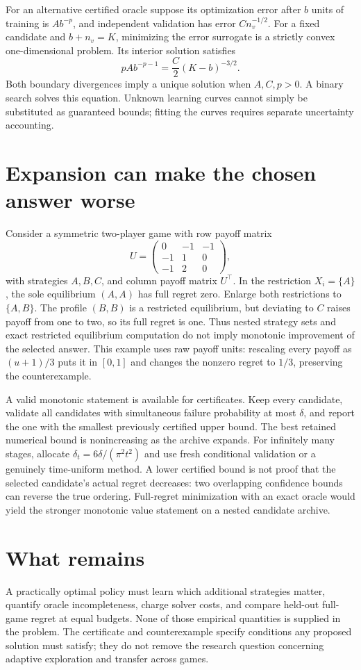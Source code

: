\documentclass[11pt]{article}
\begin{document}
For an alternative certified oracle suppose its optimization error after $b$ units of training is $A b^{-p}$, and independent validation has error $C n_v^{-1/2}$. For a fixed candidate and $b+n_v=K$, minimizing the error surrogate is a strictly convex one-dimensional problem. Its interior solution satisfies
\[
 pA b^{-p-1}=\frac C2(K-b)^{-3/2}.
\]
Both boundary divergences imply a unique solution when $A,C,p>0$. A binary search solves this equation. Unknown learning curves cannot simply be substituted as guaranteed bounds; fitting the curves requires separate uncertainty accounting.

\section*{Expansion can make the chosen answer worse}
Consider a symmetric two-player game with row payoff matrix
\[
 U=\begin{pmatrix}0&-1&-1\\-1&1&0\\-1&2&0\end{pmatrix},
\]
with strategies $A,B,C$, and column payoff matrix $U^\top$. In the restriction $X_i=\{A\}$, the sole equilibrium $(A,A)$ has full regret zero. Enlarge both restrictions to $\{A,B\}$. The profile $(B,B)$ is a restricted equilibrium, but deviating to $C$ raises payoff from one to two, so its full regret is one. Thus nested strategy sets and exact restricted equilibrium computation do not imply monotonic improvement of the selected answer. This example uses raw payoff units: rescaling every payoff as $(u+1)/3$ puts it in $[0,1]$ and changes the nonzero regret to $1/3$, preserving the counterexample.

A valid monotonic statement is available for certificates. Keep every candidate, validate all candidates with simultaneous failure probability at most $\delta$, and report the one with the smallest previously certified upper bound. The best retained numerical bound is nonincreasing as the archive expands. For infinitely many stages, allocate $\delta_t=6\delta/(\pi^2t^2)$ and use fresh conditional validation or a genuinely time-uniform method. A lower certified bound is not proof that the selected candidate's actual regret decreases: two overlapping confidence bounds can reverse the true ordering. Full-regret minimization with an exact oracle would yield the stronger monotonic value statement on a nested candidate archive.

\section*{What remains}
A practically optimal policy must learn which additional strategies matter, quantify oracle incompleteness, charge solver costs, and compare held-out full-game regret at equal budgets. None of those empirical quantities is supplied in the problem. The certificate and counterexample specify conditions any proposed solution must satisfy; they do not remove the research question concerning adaptive exploration and transfer across games.
\end{document}
